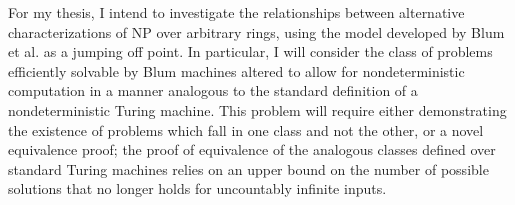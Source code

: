 \documentclass{article}
\begin{document}
\begin{spacing}{1.1}
  For my thesis, I intend to investigate the relationships between
  alternative characterizations of NP over arbitrary rings, using the
  model developed by Blum et al. as a jumping off point.  In
  particular, I will consider the class of problems efficiently
  solvable by Blum machines altered to allow for nondeterministic
  computation in a manner analogous to the standard definition of a
  nondeterministic Turing machine.  This problem will require either
  demonstrating the existence of problems which fall in one class and
  not the other, or a novel equivalence proof; the proof of
  equivalence of the analogous classes defined over standard Turing
  machines relies on an upper bound on the number of possible
  solutions that no longer holds for uncountably infinite inputs.

\end{spacing}
\end{document}
